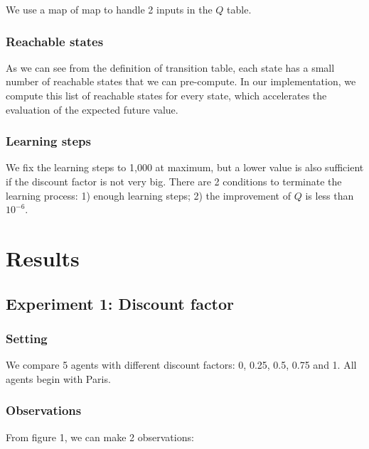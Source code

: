 \documentclass[11pt]{article}
\begin{document}
We use a map of map to handle 2 inputs in the $Q$ table.

\subsubsection{Reachable states}

As we can see from the definition of transition table, each state has a small number of reachable states that we can pre-compute. In our implementation, we compute this list of reachable states for every state, which accelerates the evaluation of the expected future value.

\subsubsection{Learning steps}

We fix the learning steps to 1,000 at maximum, but a lower value is also sufficient if the discount factor is not very big. There are 2 conditions to terminate the learning process: 1) enough learning steps; 2) the improvement of $Q$ is less than $10^{-6}$. 

\section{Results}

\subsection{Experiment 1: Discount factor}

\subsubsection{Setting}

We compare 5 agents with different discount factors: 0, 0.25, 0.5, 0.75 and 1. All agents begin with Paris.

\subsubsection{Observations}
From figure 1, we can make 2 observations:
\end{document}
